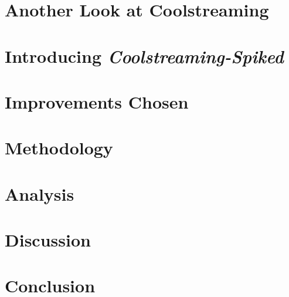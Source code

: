 \documentclass[]{article}
\begin{document}
\section{Another Look at Coolstreaming}
\section{Introducing \textit{Coolstreaming-Spiked}}
\section{Improvements Chosen}
\section{Methodology}
\section{Analysis}
\section{Discussion}
\section{Conclusion}

\printbibliography
\end{document}
